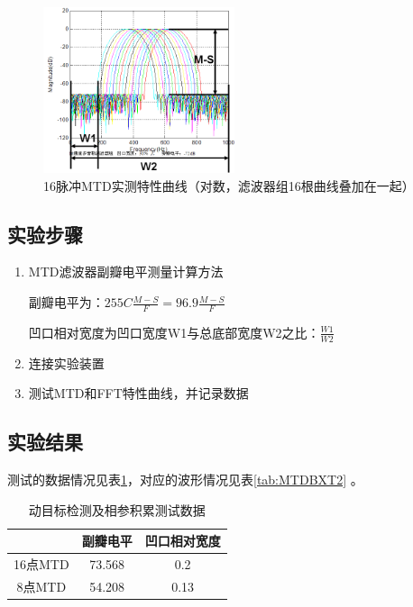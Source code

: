 \documentclass[12pt]{article}
\begin{document}
\begin{figure}[htbp]
  \centering
  \includegraphics[width=0.5\textwidth]{word/0024}
  \caption{16脉冲MTD实测特性曲线（对数，滤波器组16根曲线叠加在一起）}\label{MTDreal}
\end{figure}
\subsection{实验步骤}
\begin{enumerate}
  \item MTD滤波器副瓣电平测量计算方法\par
  副瓣电平为：$255C\frac{M-S}{F}=96.9\frac{M-S}{F}$\par
  凹口相对宽度为凹口宽度W1与总底部宽度W2之比：$\frac{W1}{W2}$
\item 连接实验装置
\item 测试MTD和FFT特性曲线，并记录数据
\end{enumerate}
\subsection{实验结果}
测试的数据情况见表\ref{tab:addlabelMTD1}，对应的波形情况见表\ref{tab:MTDBXT2}
。
\begin{table}[htbp]
  \centering
  \caption{动目标检测及相参积累测试数据}
    \begin{tabular}{|c|c|c|}
    \hline
      & 副瓣电平 & 凹口相对宽度 \\
    \hline
    16点MTD & 73.568 & 0.2 \\
    \hline
    8点MTD & 54.208 & 0.13\\
    \hline
    \end{tabular}%
  \label{tab:addlabelMTD1}%
\end{table}%
\end{document}
